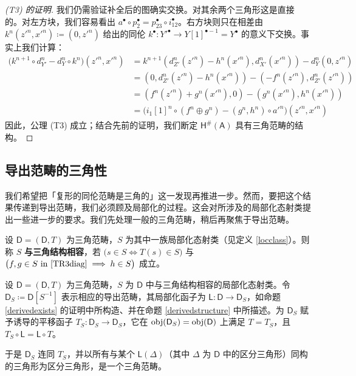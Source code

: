 \begin{proof}[(\textup{T3}) 的证明]
	我们仍需验证补全后的图确实交换。对其余两个三角形这是直接的。对左方块，我们容易看出 $a^\bullet\circ p_2^\bullet=p_{23}^\bullet\circ i_{12}^\bullet$。右方块则只在相差由 $k^n(z'^n,x'^n)\coloneqq(0,z'^n)$ 给出的同伦 $k^\bullet: Y'^\bullet\rightarrow Y[1]^{\bullet-1}=Y^\bullet$ 的意义下交换。事实上我们计算：
	\begin{align*}
		\big(k^{n+1}\!\circ\! d_{Y'}^n - d_Y^n\!\circ\! k^n\big)(z'^n,x'^n) \!&= k^{n+1}(d_{Z'}^n(z'^n)-h^n(x'^n),d_{X'}^n(x'^n))\!-\!d_Y^n(0,z'^n) \\
		&= (0,d_{Z'}^n(z'^n)-h^n(x'^n))-(-f^n(z'^n),d_{Z'}^n(z'^n))\\
		&= (f^n(z'^n)+g^n(x'^n),0) - (g^n(x'^n),h^n(x'^n)) \\
		&= \big(i_1[1]^n\circ(f^n\oplus g^n)-(g^n,h^n)\circ a'^n\big)(z'^n,x'^n)
	\end{align*}
	因此，公理 (T3) 成立；结合先前的证明，我们断定 $\mathsf{H^\#\!(A)}$ 具有三角范畴的结构。
\end{proof}


\subsection{导出范畴的三角性}


我们希望把「复形的同伦范畴是三角的」这一发现再推进一步。然而，要把这个结果传递到导出范畴，我们必须顾及局部化的过程。这会对所涉及的局部化态射类提出一些进一步的要求。我们先处理一般的三角范畴，稍后再聚焦于导出范畴。

\begin{Def}
	设 $\mathsf{D}=(\mathsf{D},T)$ 为三角范畴，$S$ 为其中一族局部化态射类（见定义 \ref{locclass}）。则称 $S$ \textbf{与三角结构相容}，若 $\big(s\in S \Leftrightarrow T(s)\in S\big)$ 与 $\big(f,g\in S\text{ in }\eqref{TR3diag}\implies h\in S\big)$ 成立。
\end{Def}

\begin{Thm}\label{derivedcatistriangulated}
	设 $\mathsf{D}=(\mathsf{D},T)$ 为三角范畴，$S$ 为 $\mathsf{D}$ 中与三角结构相容的局部化态射类。令 $\mathsf{D}_S\coloneqq\mathsf{D}[S^{-1}]$ 表示相应的导出范畴，其局部化函子为 $\mathsf{L}:\mathsf{D}\rightarrow\mathsf{D}_S$，如命题 \ref{derivedexists} 的证明中所构造、并在命题 \ref{derivedstructure} 中所描述。为 $\mathsf{D}_S$ 赋予诱导的平移函子 $T_S:\mathsf{D}_S\rightarrow\mathsf{D}_S$，它在 $\textup{obj}(\mathsf{D}_S)=\textup{obj}(\mathsf{D})$ 上满足 $T=T_S$，且 $T_S\circ\mathsf{L}=\mathsf{L}\circ T$。
	
	于是 $\mathsf{D}_S$ 连同 $T_S$，并以所有与某个 $\mathsf{L}(\Delta)$（其中 $\Delta$ 为 $\mathsf{D}$ 中的区分三角形）同构的三角形为区分三角形，是一个三角范畴。
\end{Thm}

